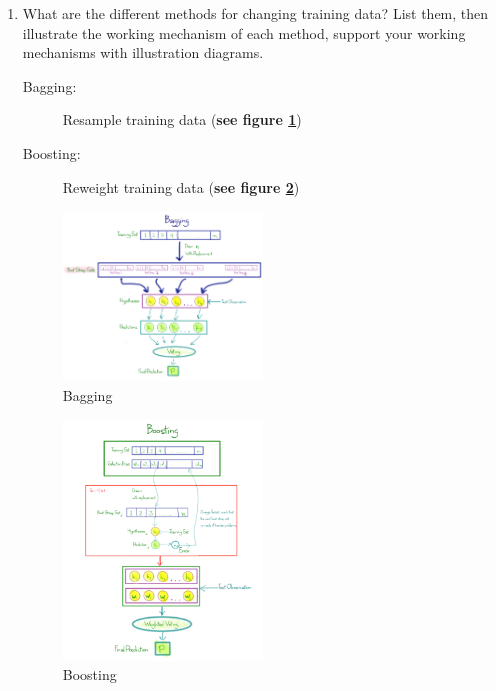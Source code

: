 \documentclass[12pt]{article}
\newenvironment{QandA}{\begin{enumerate}[label=\bfseries\arabic*.]\bfseries}
{\end{enumerate}}
\newenvironment{answered}{\par\normalfont\color{Sepia}}{}
\begin{document}
\begin{QandA}
    \item What are the different methods for changing training data? List them, then illustrate 
          the working mechanism of each method, support your working mechanisms with illustration diagrams.
    \begin{answered}
        \begin{description}
            \item[Bagging:] Resample training data (\textbf{see figure \ref{fig:bagging}})
            \item[Boosting:] Reweight training data (\textbf{see figure \ref{fig:boosting}})
        \end{description}
        \begin{figure}[h!]
            \centering
            \includegraphics[width=0.5\textwidth]{bagging.png}
            \caption{Bagging}
            \label{fig:bagging}
        \end{figure}

        \begin{figure}[h!]
            \centering
            \includegraphics[width=0.5\textwidth]{boosting.png}
            \caption{Boosting}
            \label{fig:boosting}
        \end{figure}
    \end{answered}


\end{QandA}
\end{document}
